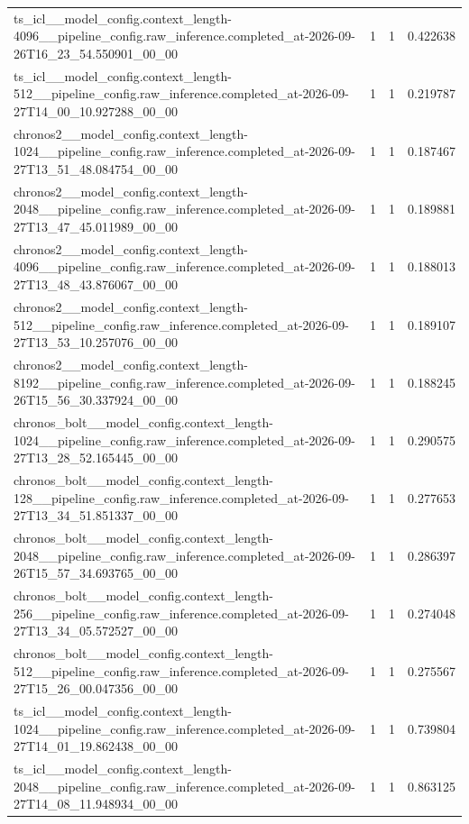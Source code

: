 \begin{tabular}{llll}
ts\_icl\_\_model\_config.context\_length-4096\_\_pipeline\_config.raw\_inference.completed\_at-2026-09-26T16\_23\_54.550901\_00\_00 & 1 & 1 & 0.422638 \\
ts\_icl\_\_model\_config.context\_length-512\_\_pipeline\_config.raw\_inference.completed\_at-2026-09-27T14\_00\_10.927288\_00\_00 & 1 & 1 & 0.219787 \\
chronos2\_\_model\_config.context\_length-1024\_\_pipeline\_config.raw\_inference.completed\_at-2026-09-27T13\_51\_48.084754\_00\_00 & 1 & 1 & 0.187467 \\
chronos2\_\_model\_config.context\_length-2048\_\_pipeline\_config.raw\_inference.completed\_at-2026-09-27T13\_47\_45.011989\_00\_00 & 1 & 1 & 0.189881 \\
chronos2\_\_model\_config.context\_length-4096\_\_pipeline\_config.raw\_inference.completed\_at-2026-09-27T13\_48\_43.876067\_00\_00 & 1 & 1 & 0.188013 \\
chronos2\_\_model\_config.context\_length-512\_\_pipeline\_config.raw\_inference.completed\_at-2026-09-27T13\_53\_10.257076\_00\_00 & 1 & 1 & 0.189107 \\
chronos2\_\_model\_config.context\_length-8192\_\_pipeline\_config.raw\_inference.completed\_at-2026-09-26T15\_56\_30.337924\_00\_00 & 1 & 1 & 0.188245 \\
chronos\_bolt\_\_model\_config.context\_length-1024\_\_pipeline\_config.raw\_inference.completed\_at-2026-09-27T13\_28\_52.165445\_00\_00 & 1 & 1 & 0.290575 \\
chronos\_bolt\_\_model\_config.context\_length-128\_\_pipeline\_config.raw\_inference.completed\_at-2026-09-27T13\_34\_51.851337\_00\_00 & 1 & 1 & 0.277653 \\
chronos\_bolt\_\_model\_config.context\_length-2048\_\_pipeline\_config.raw\_inference.completed\_at-2026-09-26T15\_57\_34.693765\_00\_00 & 1 & 1 & 0.286397 \\
chronos\_bolt\_\_model\_config.context\_length-256\_\_pipeline\_config.raw\_inference.completed\_at-2026-09-27T13\_34\_05.572527\_00\_00 & 1 & 1 & 0.274048 \\
chronos\_bolt\_\_model\_config.context\_length-512\_\_pipeline\_config.raw\_inference.completed\_at-2026-09-27T15\_26\_00.047356\_00\_00 & 1 & 1 & 0.275567 \\
ts\_icl\_\_model\_config.context\_length-1024\_\_pipeline\_config.raw\_inference.completed\_at-2026-09-27T14\_01\_19.862438\_00\_00 & 1 & 1 & 0.739804 \\
ts\_icl\_\_model\_config.context\_length-2048\_\_pipeline\_config.raw\_inference.completed\_at-2026-09-27T14\_08\_11.948934\_00\_00 & 1 & 1 & 0.863125 \\

\end{tabular}
